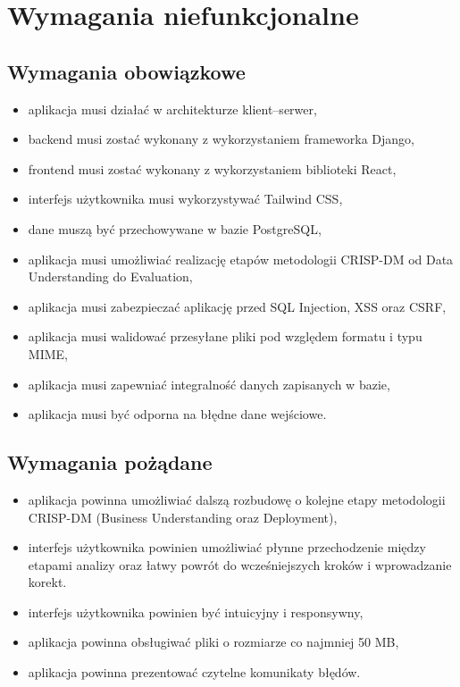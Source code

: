 \documentclass[12pt]{book}
\begin{document}
\section{Wymagania niefunkcjonalne}

\subsection{Wymagania obowiązkowe}

\begin{itemize}
\item aplikacja musi działać w architekturze klient--serwer,
\item backend musi zostać wykonany z wykorzystaniem frameworka Django,
\item frontend musi zostać wykonany z wykorzystaniem biblioteki React,
\item interfejs użytkownika musi wykorzystywać Tailwind CSS,
\item dane muszą być przechowywane w bazie PostgreSQL,
\item aplikacja musi umożliwiać realizację etapów metodologii CRISP-DM od Data Understanding do Evaluation,
\item aplikacja musi zabezpieczać aplikację przed SQL Injection, XSS oraz CSRF,
\item aplikacja musi walidować przesyłane pliki pod względem formatu i typu MIME,
\item aplikacja musi zapewniać integralność danych zapisanych w bazie,
\item aplikacja musi być odporna na błędne dane wejściowe.
\end{itemize}

\subsection{Wymagania pożądane}

\begin{itemize}
\item aplikacja powinna umożliwiać dalszą rozbudowę o kolejne etapy metodologii CRISP-DM (Business Understanding oraz Deployment),
\item interfejs użytkownika powinien umożliwiać płynne przechodzenie między etapami analizy oraz łatwy powrót do wcześniejszych kroków i wprowadzanie korekt.
\item interfejs użytkownika powinien być intuicyjny i responsywny,
\item aplikacja powinna obsługiwać pliki o rozmiarze co najmniej 50 MB,
\item aplikacja powinna prezentować czytelne komunikaty błędów.
\end{itemize}
\end{document}
